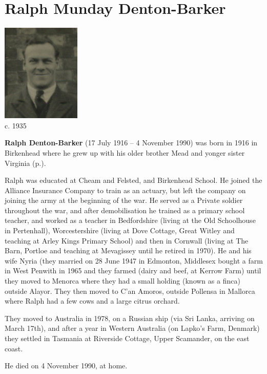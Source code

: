 \section{Ralph Munday Denton-Barker}\label{Ralph_Munday_Denton-Barker}

\begin{center}
\includegraphics[width=0.8\linewidth]{Ralph_Munday_Denton-Barker/portrait} \\
{\footnotesize c. 1935\cite{Teachers}}
\end{center}

\textbf{Ralph Denton-Barker} (17 July 1916 -- 4 November 1990) was born in 1916 in Birkenhead \cite{FreeBMD_RMDB_birth} where he grew up with his older brother Mead and yonger sister Virginia (p.\pageref{Virginia_Kathleen_Denton_Barker}).

Ralph was educated at Cheam and Felsted, and Birkenhead School. He joined the Alliance Insurance Company to train as an actuary, but left the company on joining the army at the beginning of the war. He served as a Private soldier throughout the war, and after demobilisation he trained as a primary school teacher, and worked as a teacher in Bedfordshire (living at the Old Schoolhouse in Pertenhall), Worcestershire (living at Dove Cottage, Great Witley and teaching at Arley Kings Primary School) and then in Cornwall (living at The Barn, Portloe and teaching at Mevagissey until he retired in 1970). He and his wife Nyria (they married on 28 June 1947 in Edmonton, Middlesex \cite{MarriageCertRalphDentonBarkerJoanNyriaPowell} bought a farm in West Penwith in 1965 and they farmed (dairy and beef, at Kerrow Farm) until they moved to Menorca where they had a small holding (known as a finca) outside Alayor. They then moved to C'an Amoros, outside Pollensa in Mallorca where Ralph had a few cows and a large citrus orchard.

They moved to Australia in 1978, on a Russian ship (via Sri Lanka, arriving on March 17th), and after a year in Western Australia (on Lapko's Farm, Denmark) they settled in Tasmania at Riverside Cottage, Upper Scamander, on the east coast.

He died on 4 November 1990, at home.
